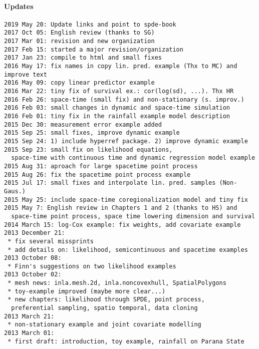 \paragraph{Updates}

\begin{verbatim}
2019 May 20: Update links and point to spde-book
2017 Oct 05: English review (thanks to SG)
2017 Mar 01: revision and new organization
2017 Feb 15: started a major revision/organization
2017 Jan 23: compile to html and small fixes
2016 May 17: fix names in copy lin. pred. example (Thx to MC) and improve text
2016 May 09: copy linear predictor example
2016 Mar 22: tiny fix of survival ex.: cor(log(sd), ...). Thx HR
2016 Feb 26: space-time (small fix) and non-stationary (s. improv.)
2016 Feb 03: small changes in dynamic and space-time simulation
2016 Feb 01: tiny fix in the rainfall example model description
2015 Dec 30: measurement error example added 
2015 Sep 25: small fixes, improve dynamic example
2015 Sep 24: 1) include hyperref package. 2) improve dynamic example
2015 Sep 23: small fix on likelihood equations, 
  space-time with continuous time and dynamic regression model example
2015 Aug 31: aproach for large spacetime point process 
2015 Aug 26: fix the spacetime point process example  
2015 Jul 17: small fixes and interpolate lin. pred. samples (Non-Gaus.)
2015 May 25: include space-time coregionalization model and tiny fix
2015 May 7: English review in Chapters 1 and 2 (thanks to HS) and 
  space-time point process, space time lowering dimension and survival
2014 March 15: log-Cox example: fix weights, add covariate example
2013 December 21: 
 * fix several missprints
 * add details on: likelihood, semicontinuous and spacetime examples 
2013 October 08: 
 * Finn's suggestions on two likelihood examples 
2013 October 02:
 * mesh news: inla.mesh.2d, inla.noncovexhull, SpatialPolygons 
 * toy-example improved (maybe more clear...) 
 * new chapters: likelihood through SPDE, point process, 
  preferential sampling, spatio temporal, data cloning
2013 March 21:
 * non-stationary example and joint covariate modelling
2013 March 01: 
 * first draft: introduction, toy example, rainfall on Parana State
\end{verbatim}
